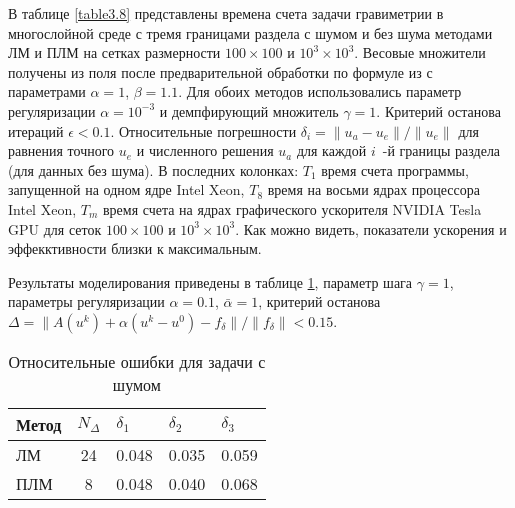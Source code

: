 В таблице \ref{table3.8} представлены времена счета задачи гравиметрии в многослойной среде с тремя границами раздела с шумом и без шума методами ЛМ и ПЛМ на сетках размерности $100\times100$ и $10^3\times10^3$. Весовые множители получены из поля после предварительной обработки по формуле из  \cite{AkMarMis2013} с параметрами $\alpha=1$, $\beta=1.1$.  Для обоих методов использовались параметр регуляризации $\alpha=10^{-3}$ и демпфирующий множитель $\gamma=1$. Критерий останова итераций $\epsilon < 0.1$. Относительные погрешности $\delta_i=\|u_a-u_e\|/\|u_e\|$ для равнения точного $u_e$ и численного решения $u_a$ для каждой $i$~-й границы раздела (для данных без шума). В последних колонках: $T_1 $ время счета программы, запущенной на одном ядре Intel Xeon, $T_8$ время на восьми ядрах процессора Intel Xeon, $T_m$ время счета на ядрах графического ускорителя NVIDIA Tesla GPU для сеток $100\times100$ и $10^3\times10^3$. Как можно видеть, показатели ускорения и эффекктивности близки к максимальным.

Результаты моделирования приведены в таблице \ref{table3.9}, параметр шага $\gamma=1$, параметры регуляризации $\alpha=0.1$, $\bar{\alpha}=1$, критерий останова $\Delta=\|A(u^k)+\alpha(u^k-u^0)-f_\delta\|/\|f_\delta\|<0.15$.
\begin{table}[H]
	\centering
	\renewcommand{\arraystretch}{1.5}
	\caption{Относительные ошибки для задачи с шумом}
	\label{table3.9}
	\begin{tabular}{|l|c|l|l|l|}
		\hline
		\textbf{Метод} & \textbf{$N_\Delta$} & \textbf{$\delta_1$} & \textbf{$\delta_2$} & \textbf{$\delta_3$} \\ \hline
		ЛМ                                                    & 24                            & 0.048                                & 0.035                                & 0.059                                \\ \hline
		ПЛМ                                                   & 8                             & 0.048                                & 0.040                                & 0.068                                \\ \hline
	\end{tabular}
\end{table}

